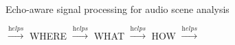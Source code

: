 \begin{frame}[t]{Echo-aware \alert{signal processing} for audio scene analysis}
    \pause
    \begin{center}
          $\xrightarrow{\textit{helps}}$ WHERE
            $\xrightarrow{\textit{helps}}$ WHAT
            $\xrightarrow{\textit{helps}}$ HOW
            $\xrightarrow{\textit{helps}}$ 
    \end{center}


\end{frame}


